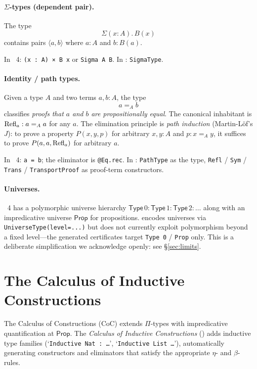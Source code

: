 \paragraph{$\Sigma$-types (dependent pair).}
The type
\begin{equation*}
  \Sigma(x : A).\, B(x)
\end{equation*}
contains pairs $\langle a, b\rangle$ where $a : A$ and $b : B(a)$.

In \Lean{}~4: \verb|(x : A) × B x| or \verb|Sigma A B|.  In
\Deppy{}: \verb|SigmaType|.

\paragraph{Identity / path types.}
Given a type $A$ and two terms $a, b : A$, the type
\begin{equation*}
  a =_A b
\end{equation*}
classifies \emph{proofs that $a$ and $b$ are propositionally equal}.
The canonical inhabitant is $\mathrm{Refl}_a : a =_A a$ for any $a$.  The
elimination principle is \emph{path induction} (Martin-L\"of's $J$):
to prove a property $P(x, y, p)$ for arbitrary $x, y : A$ and
$p : x =_A y$, it suffices to prove $P(a, a, \mathrm{Refl}_a)$ for arbitrary
$a$.

In \Lean{}~4: \verb|a = b|; the eliminator is \verb|@Eq.rec|.  In
\Deppy{}: \verb|PathType| as the type, \verb|Refl| / \verb|Sym| /
\verb|Trans| / \verb|TransportProof| as proof-term constructors.

\paragraph{Universes.}
\Lean{}~4 has a polymorphic universe hierarchy
$\mathsf{Type}\,0 : \mathsf{Type}\,1 : \mathsf{Type}\,2 : \dots$
along with an impredicative universe $\mathsf{Prop}$ for propositions.
\Deppy{} encodes universes via \verb|UniverseType(level=...)| but does
not currently exploit polymorphism beyond a fixed level---the
generated certificates target \texttt{Type 0} / \texttt{Prop} only.
This is a deliberate simplification we acknowledge openly: see
 \S{}\ref{sec:limits}.

\section{The Calculus of Inductive Constructions}
\label{sec:cic}

The Calculus of Constructions (CoC) \citep{Coquand1988CIC} extends
$\Pi$-types with impredicative quantification at $\mathsf{Prop}$.  The
\emph{Calculus of Inductive Constructions} (\CIC) adds inductive
type families (`\texttt{Inductive Nat : \dots}',
`\texttt{Inductive List \dots}'), automatically generating
constructors and eliminators that satisfy the appropriate $\eta$-
and $\beta$-rules.


